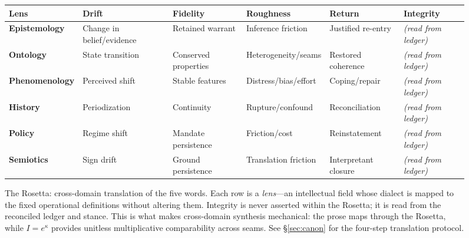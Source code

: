\documentclass[
  aps,
  prd,
  twocolumn,
  superscriptaddress,
  nofootinbib,
  floatfix
]{revtex4-2}
\begin{document}
\begin{figure}[t!]
\centering
\renewcommand{\arraystretch}{1.38}
\setlength{\tabcolsep}{5pt}
{\small
\begin{tabular}{@{}llllll@{}}
\toprule
\rowcolor{blue!20}
{\color{white}\textbf{Lens}} &
{\color{white}\textbf{Drift}} &
{\color{white}\textbf{Fidelity}} &
{\color{white}\textbf{Roughness}} &
{\color{white}\textbf{Return}} &
{\color{white}\textbf{Integrity}} \\
\midrule
\rowcolor{gray!7}
\textbf{Epistemology} &
  Change in belief/evidence &
  Retained warrant &
  Inference friction &
  Justified re-entry &
  \textit{\color{blue!50!black}(read from ledger)} \\
\textbf{Ontology} &
  State transition &
  Conserved properties &
  Heterogeneity/seams &
  Restored coherence &
  \textit{\color{blue!50!black}(read from ledger)} \\
\rowcolor{gray!7}
\textbf{Phenomenology} &
  Perceived shift &
  Stable features &
  Distress/bias/effort &
  Coping/repair &
  \textit{\color{blue!50!black}(read from ledger)} \\
\textbf{History} &
  Periodization &
  Continuity &
  Rupture/confound &
  Reconciliation &
  \textit{\color{blue!50!black}(read from ledger)} \\
\rowcolor{gray!7}
\textbf{Policy} &
  Regime shift &
  Mandate persistence &
  Friction/cost &
  Reinstatement &
  \textit{\color{blue!50!black}(read from ledger)} \\
\textbf{Semiotics} &
  Sign drift &
  Ground persistence &
  Translation friction &
  Interpretant closure &
  \textit{\color{blue!50!black}(read from ledger)} \\
\bottomrule
\end{tabular}
}
\caption{The Rosetta: cross-domain translation of the five
words.  Each row is a \emph{lens}---an intellectual field
whose dialect is mapped to the fixed operational definitions
without altering them.  Integrity is never asserted within
the Rosetta; it is read from the reconciled ledger and
stance.  This is what makes cross-domain synthesis
mechanical: the prose maps through the Rosetta, while
$I = e^\kappa$ provides unitless multiplicative comparability
across seams.  See \S\ref{sec:canon} for the four-step
translation protocol.}
\label{fig:rosetta}
\end{figure}

\clearpage
\twocolumngrid

\end{document}
